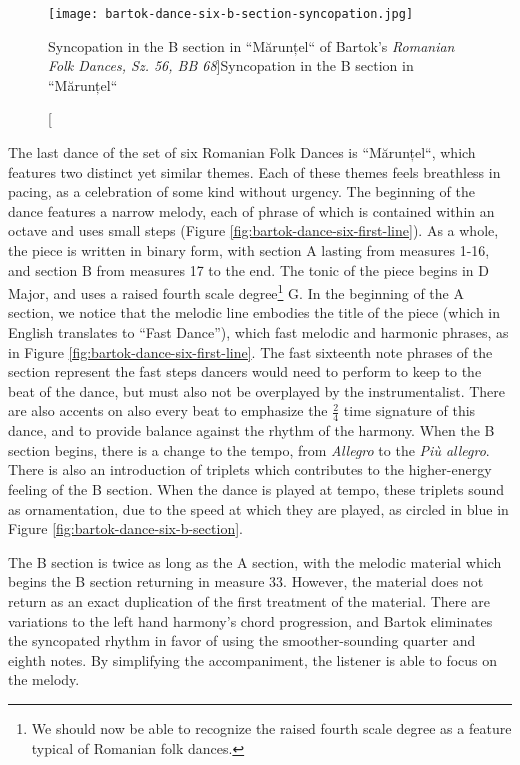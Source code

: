\begin{figure}
  \centering
  \texttt{[image: bartok-dance-six-b-section-syncopation.jpg]}
  \caption[Syncopation in the B section in ``Mărunțel`` of Bartok's \textit{Romanian Folk Dances, Sz. 56, BB 68}]{Syncopation in the B section in ``Mărunțel``}
  \label{fig:bartok-dance-six-b-section-syncopation}
\end{figure}


The last dance of the set of six Romanian Folk Dances is ``Mărunțel``, which features two distinct yet similar themes. Each of these themes feels breathless in pacing, as a celebration of some kind without urgency. The beginning of the dance features a narrow melody, each of phrase of which is contained within an octave and uses small steps (Figure \ref{fig:bartok-dance-six-first-line}\autocite{Lung_2016}). As a whole, the piece is written in binary form, with section A lasting from measures 1-16, and section B from measures 17 to the end. The tonic of the piece begins in D Major, and uses a raised fourth scale degree\footnote{We should now be able to recognize the raised fourth scale degree as a feature typical of Romanian folk dances.} G\musSharp{}. In the beginning of the A section, we notice that the melodic line embodies the title of the piece (which in English translates to ``Fast Dance''), which fast melodic and harmonic phrases, as in Figure \ref{fig:bartok-dance-six-first-line}\autocite{Lung_2016}. The fast sixteenth note phrases of the section represent the fast steps dancers would need to perform to keep to the beat of the dance, but must also not be overplayed by the instrumentalist. There are also accents on also every beat to emphasize the $\frac{2}{4}$ time signature of this dance, and to provide balance against the rhythm of the harmony. When the B section begins, there is a change to the tempo, from \textit{Allegro} to the \textit{Più allegro}. There is also an introduction of triplets which contributes to the higher-energy feeling of the B section. When the dance is played at tempo, these triplets sound as ornamentation, due to the speed at which they are played, as circled in blue in Figure \ref{fig:bartok-dance-six-b-section}\autocite{Lung_2016}. 

The B section is twice as long as the A section, with the melodic material which begins the B section returning in measure 33. However, the material does not return as an exact duplication of the first treatment of the material. There are variations to the left hand harmony's chord progression, and Bartok eliminates the syncopated rhythm in favor of using the smoother-sounding quarter and eighth notes. By simplifying the accompaniment, the listener is able to focus on the melody.

